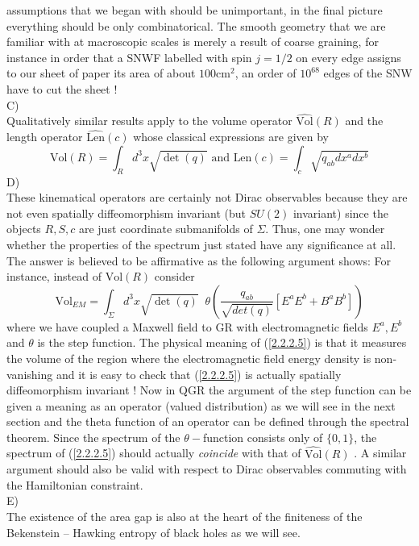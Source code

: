 \documentclass[12pt]{report}
\def\be{\begin{equation}}
\def\ee{\end{equation}}
\begin{document}
assumptions that we began with should be unimportant, in the final 
picture everything should be only combinatorical. The smooth geometry that
we are familiar with at macroscopic scales is merely a result of coarse 
graining, for instance in order that a SNWF labelled with spin $j=1/2$
on every edge assigns to our sheet of paper its area of about 
$100$cm$^2$, an order of $10^{68}$ edges of the SNW have to cut the sheet !\\
C)\\
Qualitatively similar results apply to the volume operator 
$\widehat{\mbox{Vol}}(R)$ \cite{37,38} and the length operator 
$\widehat{\mbox{Len}}(c)$ \cite{39} whose classical expressions 
are given by
\be \label{2.2.2.4}
\mbox{Vol}(R)=\int_R d^3x \sqrt{\det(q)} \mbox{ and }
\mbox{Len}(c)=\int_c \sqrt{q_{ab} dx^a dx^b}
\ee
D)\\
These kinematical operators are certainly not Dirac observables because 
they are not even spatially diffeomorphism invariant (but $SU(2)$ invariant)
since the objects $R,S,c$ are just coordinate submanifolds of $\Sigma$.
Thus, one may wonder whether the properties of the spectrum just stated 
have any significance at all. The answer is believed to be affirmative as 
the following
argument shows: For instance, instead of $\mbox{Vol}(R)$ consider 
\be \label{2.2.2.5}
\mbox{Vol}_{EM}=\int_\Sigma d^3x \sqrt{\det(q)} \;\;
\theta(\frac{q_{ab}}{\sqrt{det(q)}}[E^a E^b+B^a B^b])
\ee
where we have coupled a Maxwell field to GR with electromagnetic fields
$E^a,E^b$ and $\theta$ is the step function. The physical meaning 
of (\ref{2.2.2.5}) is that it measures the volume of the region where 
the electromagnetic field energy density is non-vanishing and it is 
easy to check that (\ref{2.2.2.5}) is actually spatially diffeomorphism 
invariant ! Now in QGR the argument of the step function can be given a 
meaning as an operator (valued distribution) as we will see in the next 
section and the theta function of an operator can be defined through 
the spectral theorem. Since the spectrum of the $\theta-$function consists
only of $\{0,1\}$, the spectrum of (\ref{2.2.2.5}) should actually {\it 
coincide}
with that of $\widehat{\mbox{Vol}}(R)$ \cite{40}. A similar argument 
should also be valid with respect to Dirac observables commuting with the 
Hamiltonian constraint.\\ 
E)\\
The existence of the area gap is also at the heart of the finiteness of the 
Bekenstein -- Hawking entropy of black holes as we will see.
\end{document}

